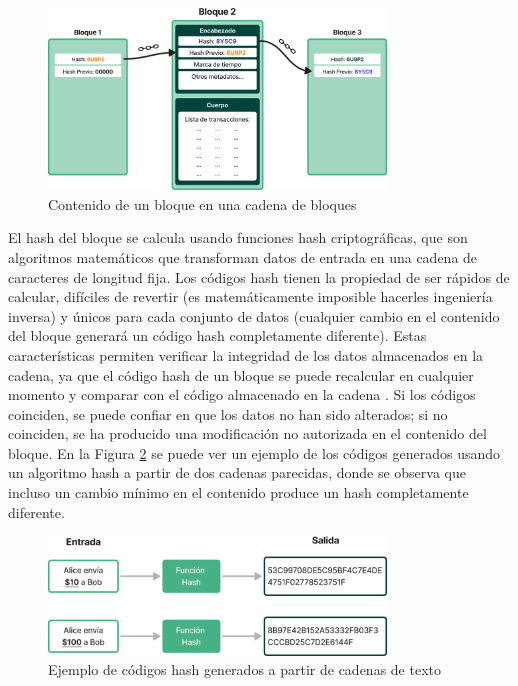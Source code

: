 \begin{figure}[!b]
    \centering
    \includegraphics[width=0.8\textwidth]{Figures/block-structure.png}
    \caption{Contenido de un bloque en una cadena de bloques}
    \label{fig:block-structure}
\end{figure}

El hash del bloque se calcula usando funciones hash criptográficas, que son algoritmos matemáticos que transforman datos de entrada en una cadena de caracteres de longitud fija. Los códigos hash tienen la propiedad de ser rápidos de calcular, difíciles de revertir (es matemáticamente imposible hacerles ingeniería inversa) y únicos para cada conjunto de datos (cualquier cambio en el contenido del bloque generará un código hash completamente diferente). Estas características permiten verificar la integridad de los datos almacenados en la cadena, ya que el código hash de un bloque se puede recalcular en cualquier momento y comparar con el código almacenado en la cadena \cite{satoshi2008bitcoin}. Si los códigos coinciden, se puede confiar en que los datos no han sido alterados; si no coinciden, se ha producido una modificación no autorizada en el contenido del bloque. En la Figura \ref{fig:hash-example} se puede ver un ejemplo de los códigos generados usando un algoritmo hash a partir de dos cadenas parecidas, donde se observa que incluso un cambio mínimo en el contenido produce un hash completamente diferente. 

\begin{figure}[!tb]
    \centering
    \includegraphics[width=0.8\textwidth]{Figures/hash-example.png}
    \caption{Ejemplo de códigos hash generados a partir de cadenas de texto}
    \label{fig:hash-example}
\end{figure}

